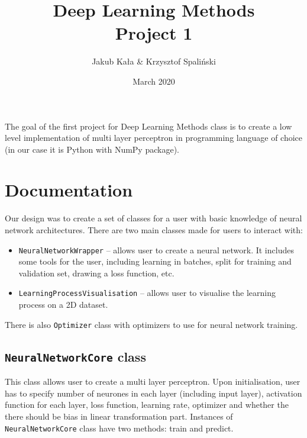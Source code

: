 \documentclass[a4]{article}
\title{Deep Learning Methods \\ Project 1}
\author{Jakub Kała \& Krzysztof Spaliński}
\date{March 2020}
\begin{document}
\maketitle


The goal of the first project for Deep Learning Methods class is to create a low level implementation of multi layer perceptron in programming language of choice (in our case it is Python with NumPy package).

\tableofcontents
\vspace{2em}


 

\newpage
\section{Documentation}

Our design was to create a set of classes for a user with basic knowledge of neural network architectures. There are two main classes made for users to interact with: 
\begin{itemize}
\itemsep0em 
	\item \texttt{NeuralNetworkWrapper} -- allows user to create a neural network. It includes some tools for the user, including learning in batches, split for training and validation set, drawing a loss function, etc.
	\item \texttt{LearningProcessVisualisation} -- allows user to visualise the learning process on a 2D dataset.
\end{itemize}
There is also \texttt{Optimizer} class with optimizers to use for neural network training.  

\subsection{\texttt{NeuralNetworkCore} class}
This class allows user to create a multi layer perceptron. Upon initialisation, user has to specify number of neurones in each layer (including input layer), activation function for each layer, loss function, learning rate, optimizer and whether the there should be bias in linear transformation part. Instances of \texttt{NeuralNetworkCore} class have two methods: train and predict. 
\end{document}
